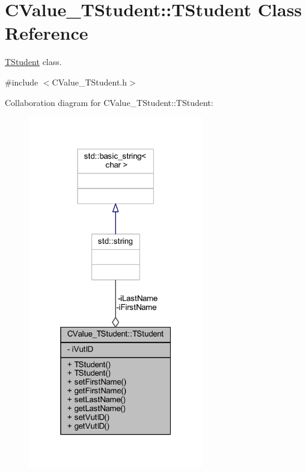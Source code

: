 \hypertarget{class_c_value___t_student_1_1_t_student}{}\section{C\+Value\+\_\+\+T\+Student\+:\+:T\+Student Class Reference}
\label{class_c_value___t_student_1_1_t_student}


\hyperlink{class_c_value___t_student_1_1_t_student}{T\+Student} class.  




{\ttfamily \#include $<$C\+Value\+\_\+\+T\+Student.\+h$>$}



Collaboration diagram for C\+Value\+\_\+\+T\+Student\+:\+:T\+Student\+:
\nopagebreak
\begin{figure}[H]
\begin{center}
\leavevmode
\includegraphics[width=217pt]{class_c_value___t_student_1_1_t_student__coll__graph}
\end{center}
\end{figure}
